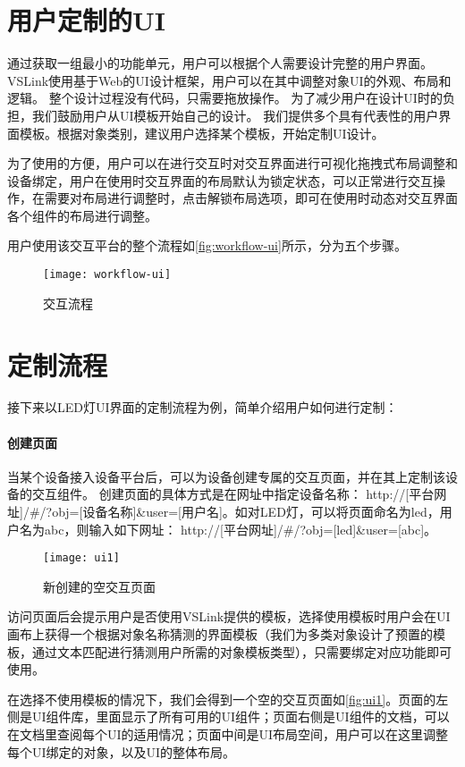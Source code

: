  
\section{用户定制的UI}
通过获取一组最小的功能单元，用户可以根据个人需要设计完整的用户界面。
VSLink使用基于Web的UI设计框架，用户可以在其中调整对象UI的外观、布局和逻辑。
整个设计过程没有代码，只需要拖放操作。
为了减少用户在设计UI时的负担，我们鼓励用户从UI模板开始自己的设计。
我们提供多个具有代表性的用户界面模板。根据对象类别，建议用户选择某个模板，开始定制UI设计。

为了使用的方便，用户可以在进行交互时对交互界面进行可视化拖拽式布局调整和设备绑定，用户在使用时交互界面的布局默认为锁定状态，可以正常进行交互操作，在需要对布局进行调整时，点击解锁布局选项，即可在使用时动态对交互界面各个组件的布局进行调整。

用户使用该交互平台的整个流程如\autoref{fig:workflow-ui}所示，分为五个步骤。

\begin{figure}[htbp]
	\centering
	\texttt{[image: workflow-ui]}
	\caption{交互流程}
	\label{fig:workflow-ui}
\end{figure}

\section{定制流程}
接下来以LED灯UI界面的定制流程为例，简单介绍用户如何进行定制：
\paragraph{创建页面}
当某个设备接入设备平台后，可以为设备创建专属的交互页面，并在其上定制该设备的交互组件。
创建页面的具体方式是在网址中指定设备名称：
http://[平台网址]/\#/?obj=[设备名称]\&user=[用户名]。如对LED灯，可以将页面命名为led，用户名为abc，则输入如下网址：
http://[平台网址]/\#/?obj=[led]\&user=[abc]。

\begin{figure}[htbp]
	\centering
	\texttt{[image: ui1]}
	\caption{新创建的空交互页面}
	\label{fig:ui1}
\end{figure}

访问页面后会提示用户是否使用VSLink提供的模板，选择使用模板时用户会在UI画布上获得一个根据对象名称猜测的界面模板（我们为多类对象设计了预置的模板，通过文本匹配进行猜测用户所需的对象模板类型），只需要绑定对应功能即可使用。

在选择不使用模板的情况下，我们会得到一个空的交互页面如\autoref{fig:ui1}。页面的左侧是UI组件库，里面显示了所有可用的UI组件；页面右侧是UI组件的文档，可以在文档里查阅每个UI的适用情况；页面中间是UI布局空间，用户可以在这里调整每个UI绑定的对象，以及UI的整体布局。

